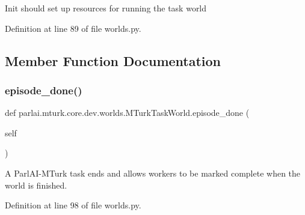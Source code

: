 \begin{DoxyVerb}Init should set up resources for running the task world\end{DoxyVerb}
 

Definition at line 89 of file worlds.\+py.



\subsection{Member Function Documentation}
\mbox{\label{classparlai_1_1mturk_1_1core_1_1dev_1_1worlds_1_1MTurkTaskWorld_a165fa922d9f59c93bbd53aaef7442ce0}} 
\subsubsection{\texorpdfstring{episode\+\_\+done()}{episode\_done()}}
{\footnotesize\ttfamily def parlai.\+mturk.\+core.\+dev.\+worlds.\+M\+Turk\+Task\+World.\+episode\+\_\+done (\begin{DoxyParamCaption}\item[{}]{self }\end{DoxyParamCaption})}

\begin{DoxyVerb}A ParlAI-MTurk task ends and allows workers to be marked complete
when the world is finished.
\end{DoxyVerb}
 

Definition at line 98 of file worlds.\+py.



